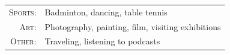 %
%



\begin{tabular}{rl}
    \textsc{Sports:} &  Badminton, dancing, table tennis \\
    \textsc{Art:} & Photography, painting, film, visiting exhibitions \\ 
    \textsc{Other:} & Traveling, listening to podcasts\\
\end{tabular}
